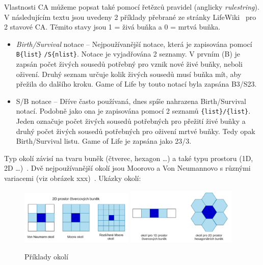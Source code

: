 Vlastnosti CA můžeme popsat také pomocí řetězců pravidel (anglicky \textit{rulestring}). V následujícím textu jsou uvedeny 2 příklady přebrané ze stránky LifeWiki~\cite{LifeWiki} pro 2 stavové CA. Těmito stavy jsou 1 = živá buňka a 0 = mrtvá buňka. 
\begin{itemize}
    \item \textit{Birth/Survival} notace -- Nejpoužívanější notace, která je zapisována pomocí \verb|B{list}| \verb|/S{nlist}|. Notace je vyjadřována 2 seznamy. V prvním (B) je zapsán počet živých sousedů potřebný pro vznik nové živé buňky, neboli oživení. Druhý seznam určuje kolik živých sousedů musí buňka mít, aby přežila do dalšího kroku. Game of Life by touto notací byla zapsána B3/S23.
    \item S/B notace -- Dříve často používaná, dnes spíše nahrazena Birth/Survival notací. Podobně jako ona je zapisována pomocí 2 seznamů \verb|{list}|\verb|/{list}|. Jeden označuje počet živých sousedů potřebných pro přežití živé buňky a druhý počet živých sousedů potřebných pro oživení mrtvé buňky. Tedy opak Birth/Survival listu. Game of Life je zapsána jako 23/3.
\end{itemize}

Typ okolí závisí na tvaru buněk (čtverec, hexagon \ldots) a také typu prostoru (1D, 2D \ldots)~\cite{ims}. Dvě nejpoužívanější okolí jsou Moorovo a Von Neumannovo s různými variacemi (viz obrázek xxx)~\cite{sloot2004cellular}. Ukázky okolí:
\begin{figure}[h]
    \centering
    \includegraphics[width=0.48\textwidth]{obrazky-figures/ch2/2D-okoli.png}\hspace{0.5cm}
    \includegraphics[width=0.47\textwidth]{obrazky-figures/ch2/jina-okoli.png}
    \caption{Příklady okolí}
    \label{2D-okoli}
\end{figure}

